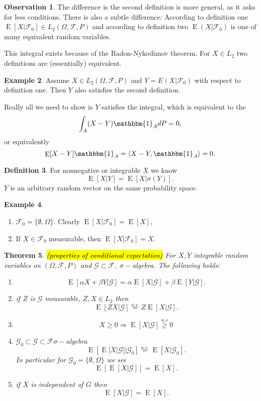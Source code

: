 \documentclass[12pt,a4paper, notitlepage]{book}
\newcommand{\hlc}[2][yellow]{ {\sethlcolor{#1} \hl{#2}} }
\theoremstyle{definition} %
\newtheorem{definition}{Definition}[section]
\newtheorem{example}[definition]{Example}
\newtheorem{observation}[definition]{Observation}
\theoremstyle{plain} %
\newtheorem{theorem}[definition]{Theorem}
\newcommand{\Fc}{\mathcal{ F}}
\newcommand{\Gc}{\mathcal{ G}}
\DeclareMathOperator{\E}{E}
\newcommand{\Important}[1]{ {\it \hlc{#1} } }
\begin{document}
\begin{observation}
The difference is the second definition is more general, as it asks for less conditions. There is also a subtle difference:
According to definition one
$\E[X | \Fc_0] \in  L_2(\Omega, \Fc, P)$ and according to definition two 
$\E(X | \Fc_0)$ is one of many equivalent random variables. 

This integral exists because of the Radon-Nykodimov theorem. For $X \in L_2$ two definitions are (essentially) equivalent.
\end{observation}

\begin{example}
Assume $X \in  L_2(\Omega, \Fc, P)$ and $Y = E(X |\Fc_0)$ with respect to definition one. Then $Y$ also satisfies the second definition.

Really all we need to show  is $Y$ satisfies the integral, which is equivalent to the 
\[ \int_A(X-Y)\mathbbm{1}_A dP = 0, \]
or equivalently
\[ \E[X - Y] \mathbbm{1}_A =  \langle X-Y, \mathbbm{1}_A \rangle = 0  .\]
\end{example}

\begin{definition}
For nonnegative or integrable $X$ we know
\[ \E[X | Y ] = \E[X | \sigma(Y)] . \]
$Y$ is an arbitrary random vector on the same probability space. 
\end{definition}


\begin{example}
\begin{enumerate}
\item $\Fc_0 = \{\emptyset, \Omega\}$. Clearly $\E[X | \Fc_0] = \E[X]$,
\item If $X \in \Fc_0$ measurable, then $\E[X | \Fc_0] = X$.
\end{enumerate}
\end{example}

\begin{theorem} \Important{(properties of conditional expectation)}
For $X,Y$ integrable random variables on $(\Omega, \Fc, P)$ and $\Gc \subset \Fc  , \;\sigma-$algebra. The following holds:
\begin{enumerate}
\item \[ \E[\alpha X + \beta Y | \Gc] = \alpha \E[X | \Gc] + \beta \E[Y | \Gc] . \]
\item if $Z$ is $ \Gc $ measurable, $Z, X \in L_2$ then 
\[ \E[Z X|\Gc] \overset{a.s.}{ = } Z \E[X|\Gc]  . \]
\item \[ X \geq 0  \Rightarrow  \E[X | \Gc] \overset{a.s}{ \geq } 0 \]
\item  $ \Gc_0 \subset \Gc \subset \Fc \sigma-$algebra
\[ \E \left[ \E[X|\Gc] |\Gc_0\right] \overset{a.s.}{=} \E[X|\Gc_0] . \]
In particular for $\Gc_0 = \{\emptyset, \Omega\}$ we see
\[ \E\left[\E[X|\Gc]\right] = \E[X] . \]
\item if $X$ is independent of $G$ then
\[ \E[X | \Gc ] = \E[X] . \]
\end{enumerate}
\end{theorem}
\end{document}
